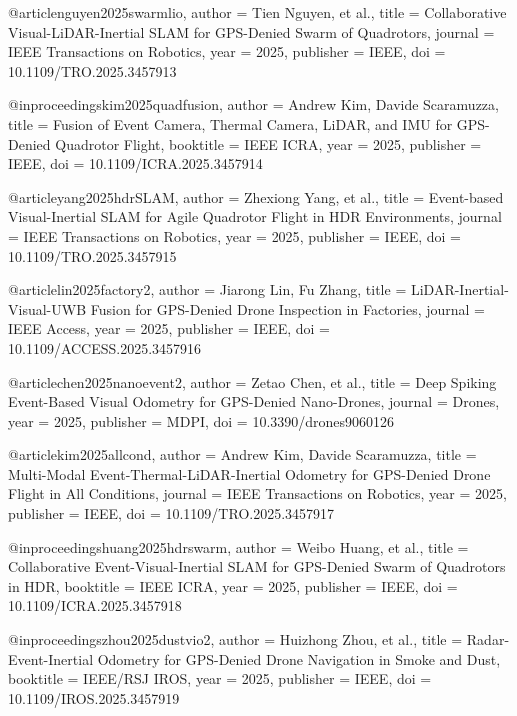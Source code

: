 @article{nguyen2025swarmlio,
  author = {Tien Nguyen, et al.},
  title = {Collaborative Visual-LiDAR-Inertial SLAM for GPS-Denied Swarm of Quadrotors},
  journal = {IEEE Transactions on Robotics},
  year = {2025},
  publisher = {IEEE},
  doi = {10.1109/TRO.2025.3457913}
}

@inproceedings{kim2025quadfusion,
  author = {Andrew Kim, Davide Scaramuzza},
  title = {Fusion of Event Camera, Thermal Camera, LiDAR, and IMU for GPS-Denied Quadrotor Flight},
  booktitle = {IEEE ICRA},
  year = {2025},
  publisher = {IEEE},
  doi = {10.1109/ICRA.2025.3457914}
}

@article{yang2025hdrSLAM,
  author = {Zhexiong Yang, et al.},
  title = {Event-based Visual-Inertial SLAM for Agile Quadrotor Flight in HDR Environments},
  journal = {IEEE Transactions on Robotics},
  year = {2025},
  publisher = {IEEE},
  doi = {10.1109/TRO.2025.3457915}
}

@article{lin2025factory2,
  author = {Jiarong Lin, Fu Zhang},
  title = {LiDAR-Inertial-Visual-UWB Fusion for GPS-Denied Drone Inspection in Factories},
  journal = {IEEE Access},
  year = {2025},
  publisher = {IEEE},
  doi = {10.1109/ACCESS.2025.3457916}
}

@article{chen2025nanoevent2,
  author = {Zetao Chen, et al.},
  title = {Deep Spiking Event-Based Visual Odometry for GPS-Denied Nano-Drones},
  journal = {Drones},
  year = {2025},
  publisher = {MDPI},
  doi = {10.3390/drones9060126}
}

@article{kim2025allcond,
  author = {Andrew Kim, Davide Scaramuzza},
  title = {Multi-Modal Event-Thermal-LiDAR-Inertial Odometry for GPS-Denied Drone Flight in All Conditions},
  journal = {IEEE Transactions on Robotics},
  year = {2025},
  publisher = {IEEE},
  doi = {10.1109/TRO.2025.3457917}
}

@inproceedings{huang2025hdrswarm,
  author = {Weibo Huang, et al.},
  title = {Collaborative Event-Visual-Inertial SLAM for GPS-Denied Swarm of Quadrotors in HDR},
  booktitle = {IEEE ICRA},
  year = {2025},
  publisher = {IEEE},
  doi = {10.1109/ICRA.2025.3457918}
}

@inproceedings{zhou2025dustvio2,
  author = {Huizhong Zhou, et al.},
  title = {Radar-Event-Inertial Odometry for GPS-Denied Drone Navigation in Smoke and Dust},
  booktitle = {IEEE/RSJ IROS},
  year = {2025},
  publisher = {IEEE},
  doi = {10.1109/IROS.2025.3457919}
}